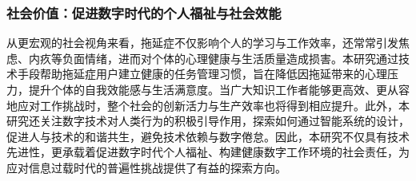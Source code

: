\subsubsection{社会价值：促进数字时代的个人福祉与社会效能}

\par 从更宏观的社会视角来看，拖延症不仅影响个人的学习与工作效率，还常常引发焦虑、内疚等负面情绪，进而对个体的心理健康与生活质量造成损害。本研究通过技术手段帮助拖延症用户建立健康的任务管理习惯，旨在降低因拖延带来的心理压力，提升个体的自我效能感与生活满意度。当广大知识工作者能够更高效、更从容地应对工作挑战时，整个社会的创新活力与生产效率也将得到相应提升。此外，本研究还关注数字技术对人类行为的积极引导作用，探索如何通过智能系统的设计，促进人与技术的和谐共生，避免技术依赖与数字倦怠。因此，本研究不仅具有技术先进性，更承载着促进数字时代个人福祉、构建健康数字工作环境的社会责任，为应对信息过载时代的普遍性挑战提供了有益的探索方向。

